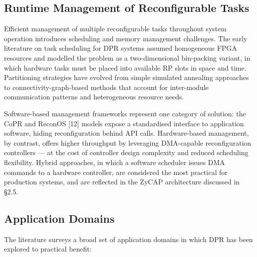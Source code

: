 \subsection{Runtime Management of Reconfigurable Tasks}

Efficient management of multiple reconfigurable tasks throughout system operation introduces scheduling and memory management challenges. The early literature on task scheduling for DPR systems assumed homogeneous FPGA resources and modelled the problem as a two-dimensional bin-packing variant, in which hardware tasks must be placed into available RP slots in space and time. Partitioning strategies have evolved from simple simulated annealing approaches to connectivity-graph-based methods that account for inter-module communication patterns and heterogeneous resource needs.

Software-based management frameworks represent one category of solution: the CoPR and ReconOS [12] models expose a standardised interface to application software, hiding reconfiguration behind API calls. Hardware-based management, by contrast, offers higher throughput by leveraging DMA-capable reconfiguration controllers — at the cost of controller design complexity and reduced scheduling flexibility. Hybrid approaches, in which a software scheduler issues DMA commands to a hardware controller, are considered the most practical for production systems, and are reflected in the ZyCAP architecture discussed in §2.5.

\subsection{Application Domains}

The literature surveys a broad set of application domains in which DPR has been explored to practical benefit:

